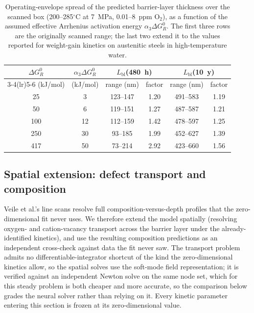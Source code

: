 \documentclass[pdflatex,sn-nature]{sn-jnl}
\begin{document}
\begin{table}[htbp]
\centering
\caption{Operating-envelope spread of the predicted barrier-layer
thickness over the scanned box (200--285$^\circ$C at 7~MPa, 0.01--8~ppm
O$_2$), as a function of the assumed effective Arrhenius activation
energy $\alpha_3\Delta G^0_R$. The first three rows are the
originally scanned range; the last two extend it to the values reported
for weight-gain kinetics on austenitic steels in high-temperature water.}
\label{tab:envelope}
\begin{tabular}{cccccc}
\toprule
$\Delta G^0_R$ & $\alpha_3\Delta G^0_R$ & \multicolumn{2}{c}{$L_\text{bl}$(480~h)} & \multicolumn{2}{c}{$L_\text{bl}$(10~y)} \\
\cmidrule(lr){3-4}\cmidrule(lr){5-6}
(kJ/mol) & (kJ/mol) & range (nm) & factor & range (nm) & factor \\
\midrule
25 & 3 & 123--147 & 1.20 & 491--583 & 1.19 \\
50 & 6 & 119--151 & 1.27 & 487--587 & 1.21 \\
100 & 12 & 112--159 & 1.42 & 478--597 & 1.25 \\
250 & 30 & 93--185 & 1.99 & 452--627 & 1.39 \\
417 & 50 & 73--214 & 2.92 & 423--660 & 1.56 \\
\bottomrule
\end{tabular}
\end{table}

\subsection{Spatial extension: defect transport and composition}\label{sec:spatial}

Veile et al.'s line scans resolve full composition-versus-depth
profiles that the zero-dimensional fit never uses. We therefore extend
the model spatially (resolving oxygen- and cation-vacancy transport
across the barrier layer under the already-identified kinetics), and
use the resulting composition predictions as an independent cross-check
against data the fit never saw. The transport problem admits no
differentiable-integrator shortcut of the kind the zero-dimensional
kinetics allow, so the spatial solves use the soft-mode field
representation; it is verified against an independent Newton solve on
the same node set, which for this steady problem is both cheaper and
more accurate, so the comparison below grades the neural solver rather
than relying on it. Every kinetic parameter entering this section is
frozen at its zero-dimensional value.
\end{document}
